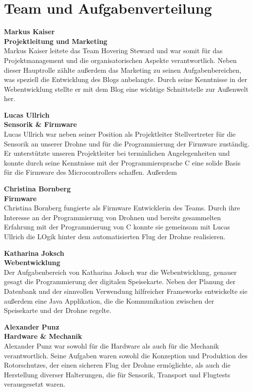 \section{Team und Aufgabenverteilung}
  \textbf{Markus Kaiser}\\
  \textbf{Projektleitung und Marketing}\\
  Markus Kaiser leitete das Team Hovering Steward und war somit für das Projektmanagement und
  die organisatorischen Aspekte verantwortlich. Neben dieser Hauptrolle zählte außerdem das Marketing
  zu seinen Aufgabenbereichen, was speziell die Entwicklung des Blogs anbelangte. Durch seine Kenntnisse
  in der Webentwicklung stellte er mit dem Blog eine wichtige Schnittstelle zur Außenwelt her.

  \textbf{Lucas Ullrich}\\
  \textbf{Sensorik \& Firmware}\\
  Lucas Ullrich war neben seiner Position als Projektleiter Stellvertreter für die Sensorik an unserer Drohne und
  für die Programmierung der Firmware zuständig. Er unterstützte unseren Projektleiter bei terminlichen Angelegenheiten
  und konnte durch seine Kenntnisse mit der Programmiersprache C eine solide Basis für die Firmware des Microcontrollers schaffen.
  Außerdem

  \textbf{Christina Bornberg}\\
  \textbf{Firmware}\\
  Christina Bornberg fungierte als Firmware Entwicklerin des Teams. Durch ihre Interesse an der Programmierung von Drohnen
  und bereits gesammelten Erfahrung mit der Programmierung von C konnte sie gemeinsam mit Lucas Ullrich die LOgik hinter
  dem automatisierten Flug der Drohne realisieren.

  \textbf{Katharina Joksch}\\
  \textbf{Webentwicklung}\\
  Der Aufgabenbereich von Katharina Joksch war die Webentwicklung, genauer gesagt die Programmierung der digitalen Speisekarte.
  Neben der Planung der Datenbank und der sinnvollen Verwendung hilfreicher Frameworks entwickelte sie außerdem eine Java Applikation,
  die die Kommunikation zwischen der Speisekarte und der Drohne regelte.

  \textbf{Alexander Punz}\\
  \textbf{Hardware \& Mechanik}\\
  Alexander Punz war sowohl für die Hardware als auch für die Mechanik verantwortlich. Seine Aufgaben waren sowohl die Konzeption
  und Produktion des Rotorschutzes, der einen sicheren Flug der Drohne ermöglichte, als auch die Herstellung diverser Halterungen,
  die für Sensorik, Transport und Flugtests verausgesetzt waren.


